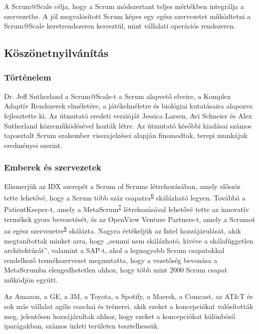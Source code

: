 \documentclass[12pt,a4paper,parskip=full]{scrartcl}
\begin{document}
A Scrum@Scale célja, hogy a Scrum módszertant teljes mértékben integrálja a szervezetbe. A jól megvalósított Scrum képes egy egész szervezetet működtetni a\\
Scrum@Scale keretrendszeren keresztül, mint vállalati operációs rendszeren.

\subsection{Köszönetnyilvánítás}\label{Acknowledgements}

\subsubsection{Történelem}\label{History}

Dr. Jeff Sutherland a Scrum@Scale-t a Scrum alapvető elveire, a Komplex Adaptív Rendszerek elméletére, a játékelméletre és biológiai kutatásaira alapozva fejlesztette ki. Az útmutató eredeti verzióját Jessica Larsen, Avi Schneier és Alex Sutherland közreműködésével hozták létre. Az útmutató későbbi kiadásai számos tapasztalt Scrum szakember visszajelzései alapján finomodtak, terepi munkájuk eredményei szerint.

\subsubsection{Emberek és szervezetek}\label{People-and-Organizations}

Elismerjük az IDX szerepét a Scrum of Scrums létrehozásában, amely először tette lehetővé, hogy a Scrum több száz csapatra\textsuperscript{\hyperref[citation6]{6}} skálázható legyen. Továbbá a \\
PatientKeeper-t, amely a MetaScrum\textsuperscript{\hyperref[citation7]{7}} létrehozásával lehetővé tette az innovatív termékek gyors bevezetését, és az OpenView Venture Partners-t, amely a Scrumot az egész szervezetre\textsuperscript{\hyperref[citation8]{8}} skálázta. Nagyra értékeljük az Intel hozzájárulását, akik megtanítottak minket arra, hogy „semmi nem skálázható, kivéve a skálafüggetlen architektúrát”, valamint a SAP-t, ahol a legnagyobb Scrum csapatokkal rendelkező termékszervezet megmutatta, hogy a vezetőség bevonása a MetaScrumba elengedhetetlen ahhoz, hogy több mint 2000 Scrum csapat működjön együtt.

Az Amazon, a GE, a 3M, a Toyota, a Spotify, a Maersk, a Comcast, az AT\&T és sok más vállalat agilis coachai és trénerei, akik ezeket a koncepciókat valósították meg, jelentősen hozzájárultak ahhoz, hogy ezeket a koncepciókat különböző iparágakban, számos üzleti területen tesztelhessük.
\end{document}
